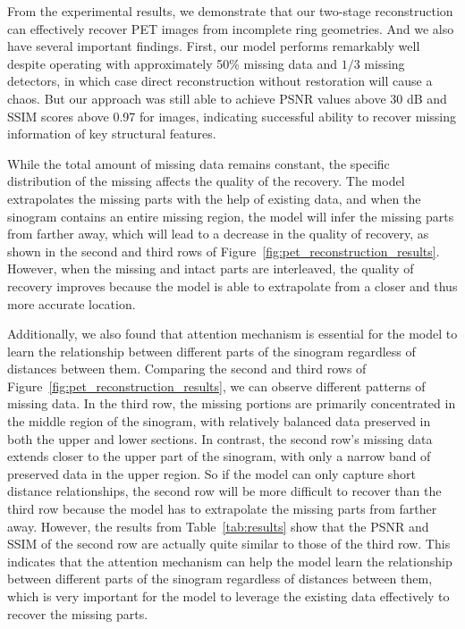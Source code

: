 \documentclass[aps,prb,preprint,groupedaddress,showkeys]{revtex4}
\begin{document}
From the experimental results, we demonstrate that our two-stage reconstruction can effectively recover  PET images from incomplete ring geometries. And we also have several important findings. 
First, our model performs remarkably well despite operating with approximately 50\% missing data and $1/3$ missing detectors, in which case direct reconstruction without restoration will cause a chaos. 
But our approach was still able to achieve PSNR values above 30 dB and SSIM scores above 0.97 for images, indicating successful ability to recover missing information of key structural features.

While the total amount of missing data remains constant, the specific distribution of the missing affects the quality of the recovery. The model extrapolates the missing parts with the help of existing data, and when the sinogram contains an entire missing region, the model will infer the missing parts from farther away, which will lead to a decrease in the quality of recovery, as shown in the second and third rows of Figure~\ref{fig:pet_reconstruction_results}. However, when the missing and intact parts are interleaved, the quality of recovery improves because the model is able to extrapolate from a closer and thus more accurate location. 

Additionally, we also found that attention mechanism is essential for the model to learn the relationship between different parts of the sinogram regardless of distances between them.
Comparing the second and third rows of Figure~\ref{fig:pet_reconstruction_results}, we can observe different patterns of missing data. In the third row, the missing portions are primarily concentrated in the middle region of the sinogram, with relatively balanced data preserved in both the upper and lower sections. In contrast, the second row's missing data extends closer to the upper part of the sinogram, with only a narrow band of preserved data in the upper region.  
So if the model can only capture short distance relationships, the second row will be more difficult to recover than the third row because the model has to extrapolate the missing parts from farther away.
However, the results from Table~\ref{tab:results} show that the PSNR and SSIM of the second row are actually quite similar to those of the third row. This indicates that the attention mechanism can help the model learn the relationship between different parts of the sinogram regardless of distances between them, which is very important for the model to leverage the existing data effectively to recover the missing parts.
\end{document}
